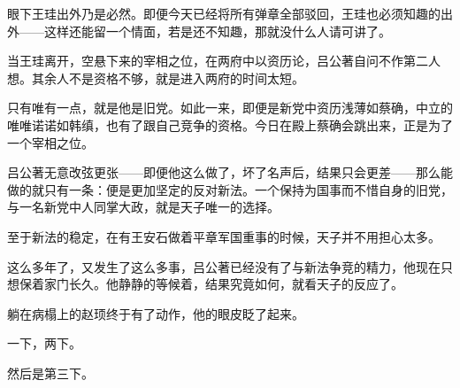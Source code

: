 眼下王珪出外乃是必然。即便今天已经将所有弹章全部驳回，王珪也必须知趣的出外——这样还能留一个情面，若是还不知趣，那就没什么人请可讲了。

当王珪离开，空悬下来的宰相之位，在两府中以资历论，吕公著自问不作第二人想。其余人不是资格不够，就是进入两府的时间太短。

只有唯有一点，就是他是旧党。如此一来，即便是新党中资历浅薄如蔡确，中立的唯唯诺诺如韩缜，也有了跟自己竞争的资格。今日在殿上蔡确会跳出来，正是为了一个宰相之位。

吕公著无意改弦更张——即便他这么做了，坏了名声后，结果只会更差——那么能做的就只有一条：便是更加坚定的反对新法。一个保持为国事而不惜自身的旧党，与一名新党中人同掌大政，就是天子唯一的选择。

至于新法的稳定，在有王安石做着平章军国重事的时候，天子并不用担心太多。

这么多年了，又发生了这么多事，吕公著已经没有了与新法争竞的精力，他现在只想保着家门长久。他静静的等候着，结果究竟如何，就看天子的反应了。

躺在病榻上的赵顼终于有了动作，他的眼皮眨了起来。

一下，两下。

然后是第三下。

